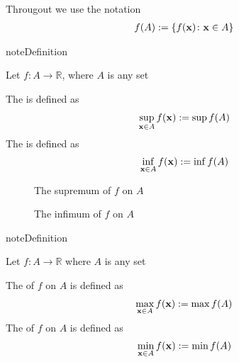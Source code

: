 \documentclass[letterpaper,10pt,english]{jupyterBook}
\begin{document}
\sphinxAtStartPar
Througout we use the notation
\begin{equation*}
\begin{split}
f(A) := \{ f({\bf x}) \colon {\bf x } \in A\}
\end{split}
\end{equation*}
\begin{sphinxadmonition}{note}{Definition}

\sphinxAtStartPar
Let \(f \colon A \to \mathbb{R}\), where \(A\) is any set

\sphinxAtStartPar
The  is defined as
\begin{equation*}
\begin{split}
%
\sup_{{\bf x} \in A} f({\bf x}) 
:= \sup f(A)
%
\end{split}
\end{equation*}
\sphinxAtStartPar
The  is defined as
\begin{equation*}
\begin{split}
%
\inf_{{\bf x} \in A} f({\bf x}) 
:= \inf f(A)
%
\end{split}
\end{equation*}\end{sphinxadmonition}

\begin{figure}[htbp]
\centering
\capstart

\noindent{}
\caption{The supremum of \(f\) on \(A\)}\label{\detokenize{06.optimization_fundamentals:id2}}\end{figure}

\begin{figure}[htbp]
\centering
\capstart

\noindent{}
\caption{The infimum of \(f\) on \(A\)}\label{\detokenize{06.optimization_fundamentals:id3}}\end{figure}

\begin{sphinxadmonition}{note}{Definition}

\sphinxAtStartPar
Let \(f \colon A \to \mathbb{R}\) where \(A\) is any set

\sphinxAtStartPar
The  of \(f\) on \(A\) is defined as
\begin{equation*}
\begin{split}
%
\max_{{\bf x} \in A} f({\bf x}) 
:= \max f(A)
%
\end{split}
\end{equation*}
\sphinxAtStartPar
The  of \(f\) on \(A\) is defined as
\begin{equation*}
\begin{split}
%
\min_{{\bf x} \in A} f({\bf x}) 
:= \min f(A)
%
\end{split}
\end{equation*}\end{sphinxadmonition}
\end{document}
